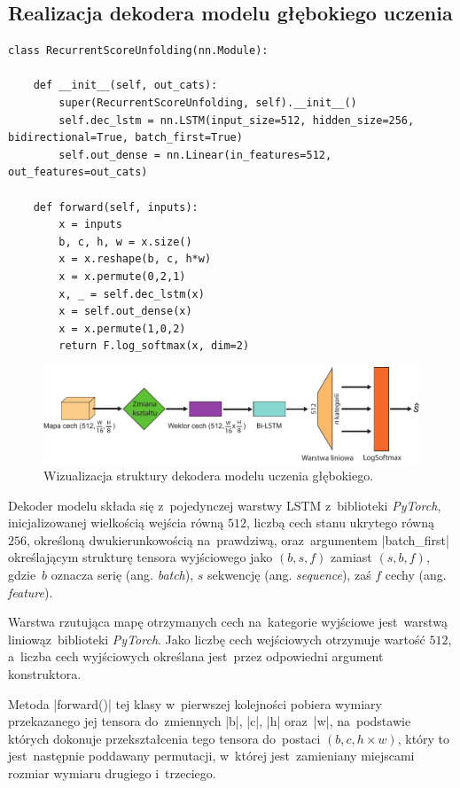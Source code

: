 \subsection{Realizacja dekodera modelu głębokiego uczenia} \label{Decoder}
\begin{lstlisting}[caption={\pyth|Decoder| - klasa dekodera modelu głębokiego uczenia.}, label={decoder}]
class RecurrentScoreUnfolding(nn.Module):

	def __init__(self, out_cats):
		super(RecurrentScoreUnfolding, self).__init__()
		self.dec_lstm = nn.LSTM(input_size=512, hidden_size=256, bidirectional=True, batch_first=True)
		self.out_dense = nn.Linear(in_features=512, out_features=out_cats)
	
	def forward(self, inputs):
		x = inputs
		b, c, h, w = x.size()
		x = x.reshape(b, c, h*w)
		x = x.permute(0,2,1)
		x, _ = self.dec_lstm(x)
		x = self.out_dense(x)
		x = x.permute(1,0,2)
		return F.log_softmax(x, dim=2)
\end{lstlisting}

\begin{figure}[h]
	\centering
	\includegraphics[width=15cm]{images/Decoder_illst}
	\caption{Wizualizacja struktury dekodera modelu uczenia głębokiego.}
	\label{fig:decoder-model-vis}
\end{figure}

Dekoder modelu składa się z~pojedynczej warstwy LSTM z~biblioteki \textit{PyTorch}, inicjalizowanej wielkością wejścia równą $512$, liczbą cech stanu ukrytego równą $256$, określoną dwukierunkowością na~prawdziwą, oraz~argumentem \pyth|batch_first| określającym strukturę tensora wyjściowego jako $(b, s, f)$ zamiast $(s, b, f)$, gdzie~$b$ oznacza serię (ang. \textit{batch}), $s$ sekwencję (ang. \textit{sequence}), zaś $f$ cechy (ang. \textit{feature}).

Warstwa rzutująca mapę otrzymanych cech na~kategorie wyjściowe jest~warstwą liniową\linebreak z~biblioteki \textit{PyTorch}. Jako liczbę cech wejściowych otrzymuje wartość $512$, a~liczba cech wyjściowych określana jest~przez odpowiedni argument konstruktora.

Metoda \pyth|forward()| tej klasy w~pierwszej kolejności pobiera wymiary przekazanego jej tensora do~zmiennych \pyth|b|, \pyth|c|, \pyth|h| oraz~\pyth|w|, na~podstawie których dokonuje przekształcenia tego tensora do~postaci $(b, c, h \times w)$, który to jest~następnie poddawany permutacji, w~której jest~zamieniany miejscami rozmiar wymiaru drugiego i~trzeciego.


